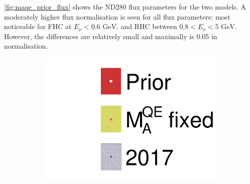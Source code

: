 \autoref{fig:maqe_prior_flux} shows the ND280 flux parameters for the two models. A moderately higher flux normalisation is seen for all flux parameters: most noticeable for FHC \numu at $E_\nu < 0.6\text{ GeV}$. and RHC \numubar between $0.8<E_\nu<5\text{ GeV}$. However, the differences are relatively small and maximally is 0.05 in normalisation.
\begin{figure}[h]
	\begin{subfigure}[t]{0.1\textwidth}
		\includegraphics[width=\textwidth, trim={0mm 0mm 0mm 0mm}, clip,page=1]{figures/mach3/data/alt/2017b_MAQEBC_Data_merg_2017b_NewData_NewDet_UpdXsecStep_2Xsec_4Det_5Flux_0.pdf}
	\end{subfigure}
	

\end{figure}
